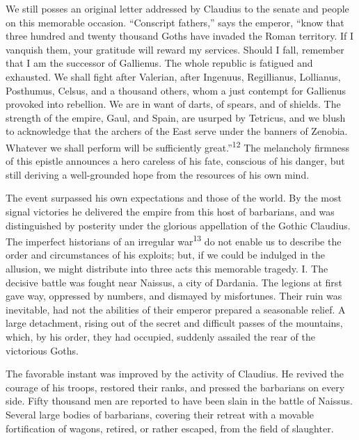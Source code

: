We still posses an original letter addressed by Claudius to the
senate and people on this memorable occasion. “Conscript
fathers,” says the emperor, “know that three hundred and twenty
thousand Goths have invaded the Roman territory. If I vanquish
them, your gratitude will reward my services. Should I fall,
remember that I am the successor of Gallienus. The whole republic
is fatigued and exhausted. We shall fight after Valerian, after
Ingenuus, Regillianus, Lollianus, Posthumus, Celsus, and a
thousand others, whom a just contempt for Gallienus provoked into
rebellion. We are in want of darts, of spears, and of shields.
The strength of the empire, Gaul, and Spain, are usurped by
Tetricus, and we blush to acknowledge that the archers of the
East serve under the banners of Zenobia. Whatever we shall
perform will be sufficiently great.”\textsuperscript{12} The melancholy firmness
of this epistle announces a hero careless of his fate, conscious
of his danger, but still deriving a well-grounded hope from the
resources of his own mind.


The event surpassed his own expectations and those of the world.
By the most signal victories he delivered the empire from this
host of barbarians, and was distinguished by posterity under the
glorious appellation of the Gothic Claudius. The imperfect
historians of an irregular war\textsuperscript{13} do not enable us to describe
the order and circumstances of his exploits; but, if we could be
indulged in the allusion, we might distribute into three acts
this memorable tragedy. I. The decisive battle was fought near
Naissus, a city of Dardania. The legions at first gave way,
oppressed by numbers, and dismayed by misfortunes. Their ruin was
inevitable, had not the abilities of their emperor prepared a
seasonable relief. A large detachment, rising out of the secret
and difficult passes of the mountains, which, by his order, they
had occupied, suddenly assailed the rear of the victorious Goths.

The favorable instant was improved by the activity of Claudius.
He revived the courage of his troops, restored their ranks, and
pressed the barbarians on every side. Fifty thousand men are
reported to have been slain in the battle of Naissus. Several
large bodies of barbarians, covering their retreat with a movable
fortification of wagons, retired, or rather escaped, from the
field of slaughter.

